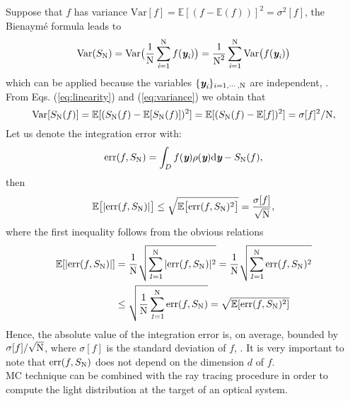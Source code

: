 Suppose that $f$ has variance $\textrm{Var}[f]=\mathbb{E}[(f-\mathbb{E}(f))]^2 = \sigma^2[f] $, the Bienaym\'e formula leads to
\begin{equation}\label{eq:variance}
\textrm{Var}(S_{\textrm{N}}) = \textrm{Var}\big(\frac{1}{\textrm{N}}\sum_{\textit{i}=1}^{\textrm{N}}f(\textit{\textbf{y}}_{\textit{i}})\big) =
 \frac{1}{\textrm{N}^2}\sum_{\textit{i}=1}^{\textrm{N}}\textrm{Var}\big(f(\textit{\textbf{y}}_{\textit{i}})\big)
\end{equation}
which can be applied because the variables $\{\textit{\textbf{y}}_{\textit{i}}\}_{i = 1, \cdots, \textrm{N}}$ are independent, \cite{}. \\ \indent
From Eqs. (\ref{eq:linearity}) and (\ref{eq:variance}) we obtain that
\begin{equation}
\textrm{Var}[S_{\textrm{N}}(f)] = \mathbb{E}[(S_{\textrm{N}}(f)-\mathbb{E}[S_{\textrm{N}}(f)])^2]= \mathbb{E}[(S_{\textrm{N}}(f)-\mathbb{E}[f])^2] = \sigma[f]^2/\textrm{N},
\end{equation}
Let us denote the integration error with:
\begin{equation}
\textrm{err}(f, S_{\textrm{N}}) =\int_{D}f(\textit{\textbf{y}})\rho(\textit{\textbf{y}}) \textrm{d}\textit{\textbf{y}}-S_{\textrm{N}}(f),
\end{equation}
then
\begin{equation}\label{eq:mean_error}
\mathbb{E}\big[|\textrm{err}(f, S_{\textrm{N}})|\big]\leq\sqrt{\mathbb{E}\big[\textrm{err}(f, S_{\textrm{N}})^2\big]} = \frac{\sigma[f]}{\sqrt{\textrm{N}}},
\end{equation}
where the first inequality follows from the obvious relations
\begin{equation}
\begin{aligned}
\mathbb{E}[|\textrm{err}(f, S_{\textrm{N}})|] &= \frac{1}{\textrm{N}}\sqrt{\sum_{\textit{1}=1}^{\textrm{N}}|\textrm{err}(f, S_{\textrm{N}})|^2}  = \frac{1}{\textrm{N}}\sqrt{\sum_{\textit{1}=1}^{\textrm{N}}\textrm{err}(f, S_{\textrm{N}})^2}  \\ 
& \leq \sqrt{\frac{1}{\textrm{N}}\sum_{\textit{1}=1}^{\textrm{N}}\textrm{err}(f, S_{\textrm{N}})}= \sqrt{\mathbb{E}[\textrm{err}(f, S_{\textrm{N}})^2]}
\end{aligned}
\end{equation}
Hence, the absolute value of the integration error is, on average, bounded by $\sigma[f]/\sqrt{\textrm{N}}$, where $\sigma[f]$ is the standard deviation of $f$, \cite{leobacher2014introduction}. It is very important to note that $\textrm{err}(f, S_{\textrm{N}})$ does not depend on the dimension $d$ of $f$.
\\ \indent MC technique can be combined with the ray tracing procedure in order to compute the light distribution at the target of an optical system.
